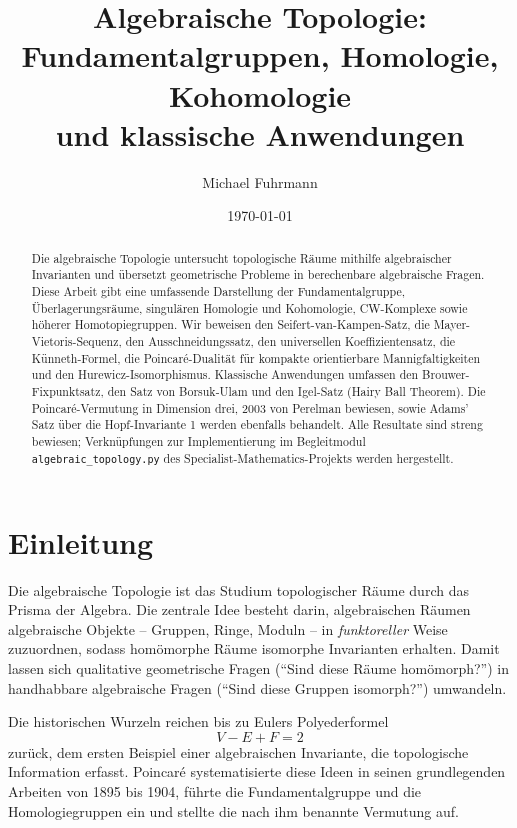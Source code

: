 \documentclass[12pt,a4paper]{amsart}
\author{Michael Fuhrmann}
\date{\today}
\theoremstyle{definition}
\begin{document}
\title{Algebraische Topologie:\\
Fundamentalgruppen, Homologie, Kohomologie\\
und klassische Anwendungen}

\begin{abstract}
Die algebraische Topologie untersucht topologische R\"aume mithilfe algebraischer
Invarianten und \"ubersetzt geometrische Probleme in berechenbare algebraische
Fragen. Diese Arbeit gibt eine umfassende Darstellung der Fundamentalgruppe,
\"Uberlagerungsr\"aume, singul\"aren Homologie und Kohomologie, CW-Komplexe sowie
h\"oherer Homotopiegruppen. Wir beweisen den Seifert-van-Kampen-Satz, die
Mayer-Vietoris-Sequenz, den Ausschneidungssatz, den universellen Koeffizientensatz,
die K\"unneth-Formel, die Poincar\'e-Dualit\"at f\"ur kompakte orientierbare
Mannigfaltigkeiten und den Hurewicz-Isomorphismus. Klassische Anwendungen umfassen
den Brouwer-Fixpunktsatz, den Satz von Borsuk-Ulam und den Igel-Satz (Hairy Ball
Theorem). Die Poincar\'e-Vermutung in Dimension drei, 2003 von Perelman bewiesen,
sowie Adams' Satz \"uber die Hopf-Invariante 1 werden ebenfalls behandelt.
Alle Resultate sind streng bewiesen; Verkn\"upfungen zur Implementierung im
Begleitmodul \texttt{algebraic\_topology.py} des Specialist-Mathematics-Projekts
werden hergestellt.
\end{abstract}

\maketitle
\tableofcontents

\section{Einleitung}

Die algebraische Topologie ist das Studium topologischer R\"aume durch das Prisma
der Algebra. Die zentrale Idee besteht darin, algebraischen R\"aumen algebraische
Objekte -- Gruppen, Ringe, Moduln -- in \emph{funktoreller} Weise zuzuordnen,
sodass hom\"omorphe R\"aume isomorphe Invarianten erhalten. Damit lassen sich
qualitative geometrische Fragen (``Sind diese R\"aume hom\"omorph?'') in
handhabbare algebraische Fragen (``Sind diese Gruppen isomorph?'') umwandeln.

Die historischen Wurzeln reichen bis zu Eulers Polyederformel
\[
  V - E + F = 2
\]
zur\"uck, dem ersten Beispiel einer algebraischen Invariante, die topologische
Information erfasst. Poincar\'e systematisierte diese Ideen in seinen grundlegenden
Arbeiten von 1895 bis 1904, f\"uhrte die Fundamentalgruppe und die Homologiegruppen
ein und stellte die nach ihm benannte Vermutung auf.
\end{document}
